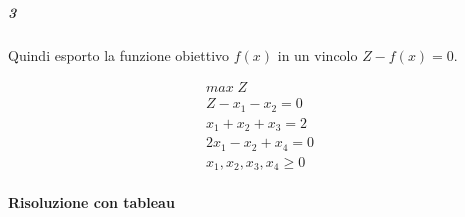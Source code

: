 \documentclass[a4paper,12pt,oneside]{article}
\begin{document}
    \subparagraph{3}

    Quindi esporto la funzione obiettivo $f(x)$ in un vincolo $Z - f(x) = 0$.

    \begin{align}
        \text{$max \; Z$} \\
        \text{$Z - x_1 - x_2 = 0$} \\
        \text{$x_1 + x_2 + x_3 = 2$} \\
        \text{$2 x_1 - x_2 + x_4 = 0$} \\
        \text{$x_1, x_2, x_3, x_4 \geq 0$}
     \end{align}

    \paragraph{Risoluzione con tableau}
\end{document}
